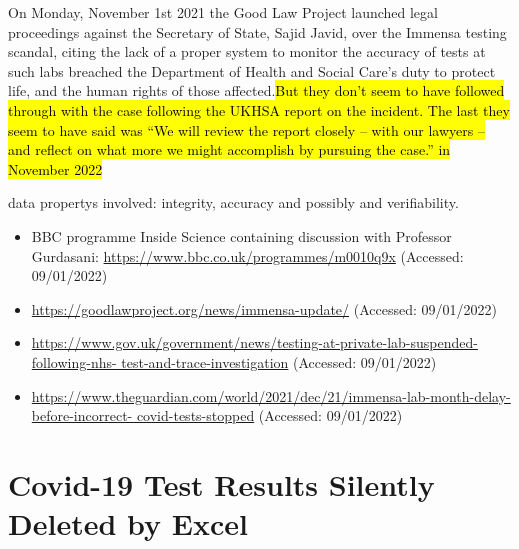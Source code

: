 On Monday, November 1st 2021 the Good Law Project launched legal proceedings against the Secretary of State, Sajid Javid, over the Immensa testing scandal,
citing the lack of a proper system to monitor the \gls{accuracy} of tests at such labs breached the Department of Health and Social Care's duty to protect life, and the human rights of those affected.\hl{But they don't seem to have followed through with the case following the UKHSA report on the incident. The last they seem to have said was ``We will review the report closely – with our lawyers – and reflect on what more we might accomplish by pursuing the case.'' in November 2022}

\Glspl{data property} involved: \gls{integrity}, \gls{accuracy} and possibly  and \gls{verifiability}.

\begin{itemize}
  \item BBC programme Inside Science containing discussion with Professor Gurdasani: \href{https://www.bbc.co.uk/programmes/m0010q9x}{https://www.bbc.co.uk/programmes/m0010q9x} (Accessed: 09/01/2022)
  \item\href{https://goodlawproject.org/news/immensa-update/}{https://goodlawproject.org/news/immensa-update/} (Accessed: 09/01/2022)
  \item\href{https://www.gov.uk/government/news/testing-at-private-lab-suspended-following-nhs-test-and-trace-investigation}{https://www.gov.uk/government/news/testing-at-private-lab-suspended-following-nhs- test-and-trace-investigation} (Accessed: 09/01/2022)
  \item\href{https://www.theguardian.com/world/2021/dec/21/immensa-lab-month-delay-before-incorrect-covid-tests-stopped}{https://www.theguardian.com/world/2021/dec/21/immensa-lab-month-delay-before-incorrect- covid-tests-stopped} (Accessed: 09/01/2022)
\end{itemize}

\section{Covid-19 Test Results Silently Deleted by Excel} \label{bkm:incacc:covidexcel}

